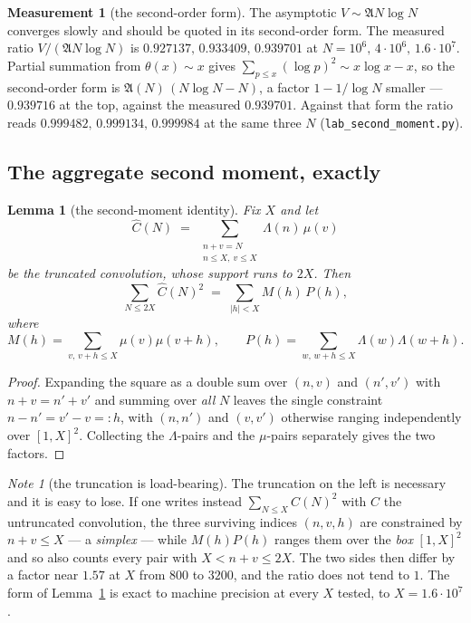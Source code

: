 \documentclass[11pt,a4paper]{article}
\theoremstyle{plain}
\newtheorem{lemma}[theorem]{Lemma}
\theoremstyle{definition}
\newtheorem{measurement}[theorem]{Measurement}
\theoremstyle{remark}
\newtheorem{note}[theorem]{Note}
\newcommand{\AAA}{\mathfrak{A}}
\begin{document}
\begin{measurement}[the second-order form]\label{meas:secondorder}
The asymptotic $V\sim\AAA N\log N$ converges slowly and should be
quoted in its second-order form. The measured ratio
$V/(\AAA N\log N)$ is $0.927137,\,0.933409,\,0.939701$ at
$N=10^6,\,4\cdot10^6,\,1.6\cdot10^7$. Partial summation from
$\theta(x)\sim x$ gives $\sum_{p\le x}(\log p)^2\sim x\log x-x$, so
the second-order form is $\AAA(N)\,(N\log N-N)$, a factor
$1-1/\log N$ smaller --- $0.939716$ at the top, against the measured
$0.939701$. Against that form the ratio reads
$0.999482,\,0.999134,\,0.999984$ at the same three $N$
(\texttt{lab\_second\_moment.py}).
\end{measurement}

\subsection{The aggregate second moment, exactly}

\begin{lemma}[the second-moment identity]\label{lem:MP}
Fix $X$ and let
\[
  \widehat C(N)\;=\;\sum_{\substack{n+v=N\\ n\le X,\ v\le X}}
    \Lambda(n)\,\mu(v)
\]
be the truncated convolution, whose support runs to $2X$. Then
\[
  \sum_{N\le2X}\widehat C(N)^2\;=\;\sum_{|h|<X}M(h)\,P(h),
\]
where
\[
  M(h)=\sum_{v,\,v+h\le X}\mu(v)\mu(v+h),
  \qquad
  P(h)=\sum_{w,\,w+h\le X}\Lambda(w)\Lambda(w+h).
\]
\end{lemma}

\begin{proof}
Expanding the square as a double sum over $(n,v)$ and $(n',v')$ with
$n+v=n'+v'$ and summing over \emph{all} $N$ leaves the single
constraint $n-n'=v'-v=:h$, with $(n,n')$ and $(v,v')$ otherwise
ranging independently over $[1,X]^2$. Collecting the $\Lambda$-pairs
and the $\mu$-pairs separately gives the two factors.
\end{proof}

\begin{note}[the truncation is load-bearing]\label{note:trunc}
The truncation on the left is necessary and it is easy to lose. If one
writes instead $\sum_{N\le X}C(N)^2$ with $C$ the untruncated
convolution, the three surviving indices $(n,v,h)$ are constrained by
$n+v\le X$ --- a \emph{simplex} --- while $M(h)P(h)$ ranges them over
the \emph{box} $[1,X]^2$ and so also counts every pair with
$X<n+v\le2X$. The two sides then differ by a factor near $1.57$ at $X$
from $800$ to $3200$, and the ratio does not tend to $1$. The form of
Lemma~\ref{lem:MP} is exact to machine precision at every $X$ tested,
to $X=1.6\cdot10^7$.
\end{note}
\end{document}
